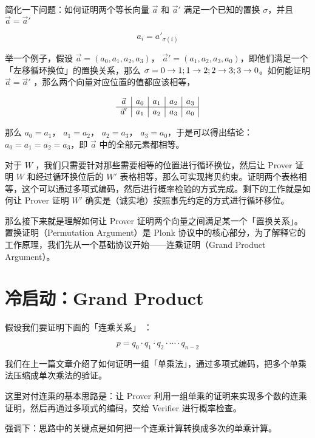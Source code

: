 简化一下问题：如何证明两个等长向量 \(\vec{a}\) 和 \(\vec{a}'\)
满足一个已知的置换 \(\sigma\)，并且 \(\vec{a}=\vec{a}'\)

\[
a_i=a'_{\sigma(i)}
\]

举一个例子，假设 \(\vec{a}=(a_0,a_1,a_2,a_3)\)，
\(\vec{a}'=(a_1,a_2,a_3,a_0)\)，即他们满足一个「左移循环换位」的置换关系，那么
\(\sigma=\\{0\to 1; 1\to 2; 2\to 3; 3\to0\\}\)。如何能证明
\(\vec{a}=\vec{a}'\) ，那么两个向量对应位置的值都应该相等，

\[
\begin{array}{c{|}c|c|c|c|c}
\vec{a} & a_0 & a_1 & a_2 & a_3 \\
\hline
\vec{a}' & a_1 & a_2 & a_3 & a_0 \\
\end{array}
\]

那么 \(a_0=a_1\)， \(a_1=a_2\)， \(a_2=a_3\)，
\(a_3=a_0\)，于是可以得出结论： \(a_0=a_1=a_2=a_3\)，即 \(\vec{a}\)
中的全部元素都相等。

对于 \(W\) ，我们只需要针对那些需要相等的位置进行循环换位，然后让 Prover
证明 \(W\) 和经过循环换位后的 \(W'\)
表格相等，那么可实现拷贝约束。证明两个表格相等，这个可以通过多项式编码，然后进行概率检验的方式完成。剩下的工作就是如何让
Prover 证明 \(W'\) 确实是（诚实地）按照事先约定的方式进行循环移位。

那么接下来就是理解如何让 Prover 证明两个向量之间满足某一个「置换关系」。
置换证明（Permutation Argument）是 Plonk
协议中的核心部分，为了解释它的工作原理，我们先从一个基础协议开始------连乘证明（Grand
Product Argument）。

\hypertarget{ux51b7ux542fux52a8grand-product}{%
\section{冷启动：Grand
Product}\label{ux51b7ux542fux52a8grand-product}}

假设我们要证明下面的「连乘关系」 ：

\[
p = q_0\cdot q_1 \cdot q_2 \cdot \cdots \cdot q_{n-2}
\]

我们在上一篇文章介绍了如何证明一组「单乘法」，通过多项式编码，把多个单乘法压缩成单次乘法的验证。

这里对付连乘的基本思路是：让 Prover
利用一组单乘的证明来实现多个数的连乘证明，然后再通过多项式的编码，交给
Verifier 进行概率检查。

强调下：思路中的关键点是如何把一个连乘计算转换成多次的单乘计算。

